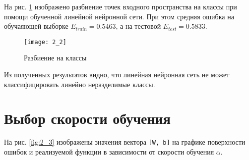 На рис. \ref{fig:2_2} изображено разбиение точек входного пространства на классы при помощи обученной линейной нейронной сети. При этом средняя ошибка на обучаяющей выборке $E_{train} = 0.5463$, а на тестовой $E_{test} = 0.5833$.
\begin{figure}[H]
\begin{center}
	\texttt{[image: 2\_2]}
	\caption{Разбиение на классы}
	\label{fig:2_2}
\end{center}
\end{figure}

Из полученных результатов видно, что линейная нейронная сеть не может классифицировать линейно неразделимые классы.

\section{Выбор скорости обучения}


На рис. \ref{fig:2_3} изображены значения вектора \verb+[W, b]+ на графике поверхности ошибок и реализуемой функции в зависимости от скорости обучения $\alpha$.

